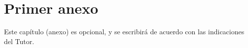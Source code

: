 \chapter{Primer anexo}
Este capítulo (anexo) es opcional, y se escribirá de acuerdo con las indicaciones del Tutor.
